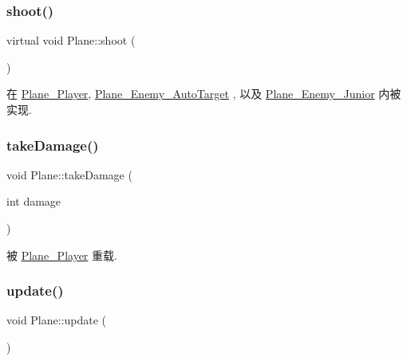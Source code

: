 \mbox{\label{class_plane_af999499b5e79309d94004e8d012fe9c4}} 
\subsubsection{\texorpdfstring{shoot()}{shoot()}}
{\footnotesize\ttfamily virtual void Plane\+::shoot (\begin{DoxyParamCaption}{ }\end{DoxyParamCaption})\hspace{0.3cm}{\ttfamily [pure virtual]}}



在 \hyperlink{class_plane___player_a3ffa86506370f74ec859e74d42c568c2}{Plane\+\_\+\+Player}, \hyperlink{class_plane___enemy___auto_target_a002ba5754abc49b37ab3131f1a8f48c7}{Plane\+\_\+\+Enemy\+\_\+\+Auto\+Target} , 以及 \hyperlink{class_plane___enemy___junior_ac9c3559aa4616f1b1efbe4a055fca0ac}{Plane\+\_\+\+Enemy\+\_\+\+Junior} 内被实现.

\mbox{\label{class_plane_a1a93dbb00292aaae274c152079f5f6f3}} 
\subsubsection{\texorpdfstring{take\+Damage()}{takeDamage()}}
{\footnotesize\ttfamily void Plane\+::take\+Damage (\begin{DoxyParamCaption}\item[{int}]{damage }\end{DoxyParamCaption})\hspace{0.3cm}{\ttfamily [virtual]}}



被 \hyperlink{class_plane___player_a40e7f20858e2738e5a72b15eb1c28421}{Plane\+\_\+\+Player} 重载.

\mbox{\label{class_plane_a7fbb07f76503fe057772e01f542afc32}} 
\subsubsection{\texorpdfstring{update()}{update()}}
{\footnotesize\ttfamily void Plane\+::update (\begin{DoxyParamCaption}{ }\end{DoxyParamCaption})\hspace{0.3cm}{\ttfamily [virtual]}}



